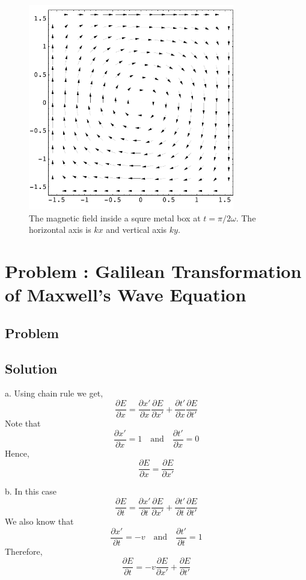 \documentclass[solutions]{esg8022pset}
\begin{document}
\begin{figure}[H]
    \centering
    \includegraphics[width = 9cm]{em2}
    \caption{The magnetic field inside a squre metal box at
$t=\pi/2\omega$.  The horizontal axis is $kx$ and vertical axis $ky$.}
  \end{figure}

\section{Problem \thesection: Galilean Transformation of Maxwell's Wave Equation}
\subsection{Problem}
\subsection{Solution}

a. Using chain rule we get,
$$\frac{\partial E}{\partial x} = \frac{\partial x'}{\partial x}\frac{\partial E}{\partial x'} + \frac{\partial t'}{\partial x}\frac{\partial E}{\partial t'}$$
Note that
$$\frac{\partial x'}{\partial x} = 1 \quad \mbox{and} \quad  \frac{\partial t'}{\partial x} = 0$$
Hence,
$$\frac{\partial E}{\partial x} = \frac{\partial E}{\partial x'}$$


b. In this case
$$\frac{\partial E}{\partial t} = \frac{\partial x'}{\partial t}\frac{\partial E}{\partial x'} + \frac{\partial t'}{\partial t}\frac{\partial E}{\partial t'}$$
We also know that
$$\frac{\partial x'}{\partial t} = -v \quad \mbox{and} \quad  \frac{\partial t'}{\partial t} = 1$$
Therefore,
$$\frac{\partial E}{\partial t} = -v \frac{\partial E}{\partial x'} + \frac{\partial E}{\partial t'}$$
\end{document}
